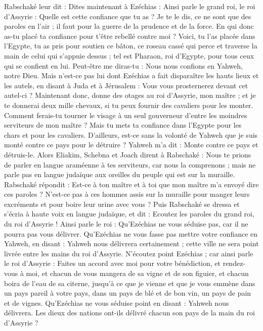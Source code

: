 \begin{multicols}{2}
Rabschaké leur dit : Dites maintenant à Ezéchias : Ainsi parle le grand roi, le roi d’Assyrie : Quelle est cette confiance que tu as ?
Je te le dis, ce ne sont que des paroles en l’air ; il faut pour la guerre de la prudence et de la force. En qui donc as-tu placé ta confiance pour t’être rebellé contre moi ?
Voici, tu l’as placée dans l’Egypte, tu as pris pour soutien ce bâton, ce roseau cassé qui perce et traverse la main de celui qui s’appuie dessus ; tel est Pharaon, roi d’Egypte, pour tous ceux qui se confient en lui.
Peut-être me diras-tu : Nous nous confions en Yahweh, notre Dieu. Mais n'est-ce pas lui dont Ezéchias a fait disparaître les hauts lieux et les autels, en disant à Juda et à Jérusalem : Vous vous prosternerez devant cet autel-ci ?
Maintenant donc, donne des otages au roi d’Assyrie, mon maître ; et je te donnerai deux mille chevaux, si tu peux fournir des cavaliers pour les monter.
Comment ferais-tu tourner le visage à un seul gouverneur d’entre les moindres serviteurs de mon maître ? Mais tu mets ta confiance dans l'Egypte pour les chars et pour les cavaliers.
D’ailleurs, est-ce sans la volonté de Yahweh que je suis monté contre ce pays pour le détruire ? Yahweh m'a dit : Monte contre ce pays et détruis-le.
Alors Eliakim, Schebna et Joach dirent à Rabschaké : Nous te prions de parler en langue araméenne à tes serviteurs, car nous la comprenons ; mais ne parle pas en langue judaïque aux oreilles du peuple qui est sur la muraille.
Rabschaké répondit : Est-ce à ton maître et à toi que mon maître m’a envoyé dire ces paroles ? N’est-ce pas à ces hommes assis sur la muraille pour manger leurs excréments et pour boire leur urine avec vous ?
Puis Rabschaké se dressa et s'écria à haute voix en langue judaïque, et dit : Ecoutez les paroles du grand roi, du roi d’Assyrie !
Ainsi parle le roi : Qu'Ezéchias ne vous séduise pas, car il ne pourra pas vous délivrer.
Qu'Ezéchias ne vous fasse pas mettre votre confiance en Yahweh, en disant : Yahweh nous délivrera certainement ; cette ville ne sera point livrée entre les mains du roi d’Assyrie.
N'écoutez point Ezéchias ; car ainsi parle le roi d’Assyrie : Faites un accord avec moi pour votre bénédiction, et rendez-vous à moi, et chacun de vous mangera de sa vigne et de son figuier, et chacun boira de l'eau de sa citerne,
jusqu'à ce que je vienne et que je vous emmène dans un pays pareil à votre pays, dans un pays de blé et de bon vin, un pays de pain et de vignes.
Qu'Ezéchias ne vous séduise point en disant : Yahweh nous délivrera. Les dieux des nations ont-ils délivré chacun son pays de la main du roi d’Assyrie ?

\end{multicols}
